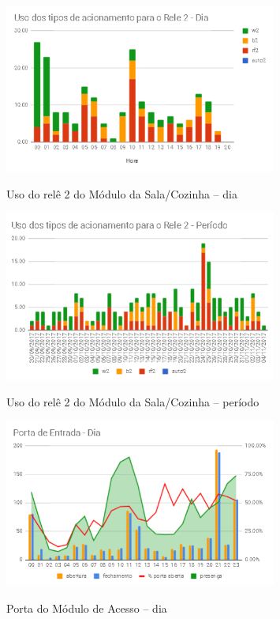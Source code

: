\begin{figure}[H]
	\centering
	\caption{Uso do relê 2 do Módulo da Sala/Cozinha -- dia}
	\includegraphics[width=0.8\textwidth]{usorele2salacozinhadia}
	\label{fig:usorele2salacozinhadia}
\end{figure}

\begin{figure}[H]
	\centering
	\caption{Uso do relê 2 do Módulo da Sala/Cozinha -- período}
	\includegraphics[width=0.8\textwidth]{usorele2salacozinhaperiodo}
	\label{fig:usorele2salacozinhaperiodo}
\end{figure}

\begin{figure}[H]
	\centering
	\caption{Porta do Módulo de Acesso -- dia}
	\includegraphics[width=0.8\textwidth]{portaentradadia}
	\label{fig:portaentradadia}
\end{figure}

